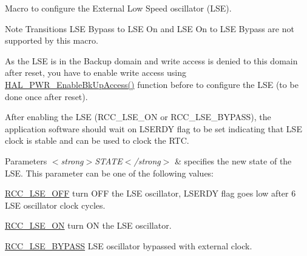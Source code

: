 Macro to configure the External Low Speed oscillator (L\+SE). 

\begin{DoxyNote}{Note}
Transitions L\+SE Bypass to L\+SE On and L\+SE On to L\+SE Bypass are not supported by this macro. 

As the L\+SE is in the Backup domain and write access is denied to this domain after reset, you have to enable write access using \hyperlink{group___p_w_r___exported___functions___group2_ga3d07cef39bf294db4aed7e06e5dbf9af}{H\+A\+L\+\_\+\+P\+W\+R\+\_\+\+Enable\+Bk\+Up\+Access()} function before to configure the L\+SE (to be done once after reset). 

After enabling the L\+SE (R\+C\+C\+\_\+\+L\+S\+E\+\_\+\+ON or R\+C\+C\+\_\+\+L\+S\+E\+\_\+\+B\+Y\+P\+A\+SS), the application software should wait on L\+S\+E\+R\+DY flag to be set indicating that L\+SE clock is stable and can be used to clock the R\+TC. 
\end{DoxyNote}

\begin{DoxyParams}{Parameters}
{\em $<$strong$>$\+S\+T\+A\+T\+E$<$/strong$>$} & specifies the new state of the L\+SE. This parameter can be one of the following values\+: \begin{DoxyItemize}
\item \hyperlink{group___r_c_c___l_s_e___config_ga6645c27708d0cad1a4ab61d2abb24c77}{R\+C\+C\+\_\+\+L\+S\+E\+\_\+\+O\+FF} turn O\+FF the L\+SE oscillator, L\+S\+E\+R\+DY flag goes low after 6 L\+SE oscillator clock cycles. \item \hyperlink{group___r_c_c___l_s_e___config_gac981ea636c2f215e4473901e0912f55a}{R\+C\+C\+\_\+\+L\+S\+E\+\_\+\+ON} turn ON the L\+SE oscillator. \item \hyperlink{group___r_c_c___l_s_e___config_gaad580157edbae878edbcc83c5a68e767}{R\+C\+C\+\_\+\+L\+S\+E\+\_\+\+B\+Y\+P\+A\+SS} L\+SE oscillator bypassed with external clock. \end{DoxyItemize}
\\
\hline
\end{DoxyParams}
